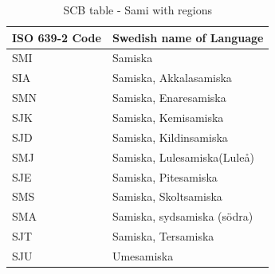 \documentclass[12pt, twoside]{article}
\begin{document}
\begin{table}[!htp]
    \caption{SCB table - Sami with regions}
    \label{tab:SCBsami}
    \begin{tabular}{L{3cm}|L{6.5cm}}
      \textbf{\gls{ISO} 639-2 Code} &\textbf{Swedish name of Language}\\
      \hline
SMI &   Samiska\\
SIA &   Samiska, Akkalasamiska\\
SMN &   Samiska, Enaresamiska\\
SJK &   Samiska, Kemisamiska\\
SJD &   Samiska, Kildinsamiska\\
SMJ &   Samiska, Lulesamiska(Luleå)\\
SJE &   Samiska, Pitesamiska\\
SMS &   Samiska, Skoltsamiska\\
SMA &  Samiska, sydsamiska (södra)\\
SJT &  Samiska, Tersamiska\\
SJU &  Umesamiska\\
\end{tabular}
\end{table}
\clearpage
\end{document}
